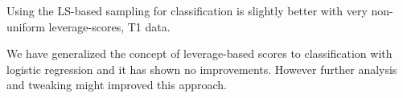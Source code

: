 \documentclass{article}
\begin{document}
Using the LS-based sampling for classification is slightly better with very non-uniform leverage-scores, T1 data.

We have generalized the concept of leverage-based scores to classification with logistic regression and it has shown no improvements. However further analysis and tweaking might improved this approach.




\end{document}
